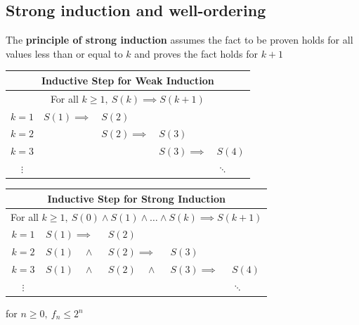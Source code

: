 \subsection{Strong induction and well-ordering}
The \textbf{principle of strong induction} assumes the fact to be proven holds for all values
less than or equal to $k$ and proves the fact holds for $k+1$
\begin{center}
  \begin{tabular}{cllll}
    \multicolumn{5}{c}{Inductive Step for Weak Induction}                  \\
    \hline
    \multicolumn{5}{c}{For all $k\geq1,~S(k) \implies S(k+1)$}             \\
    $k=1$    & $S(1)\implies$ & $S(2)$         &                &          \\
    $k=2$    &                & $S(2)\implies$ & $S(3)$         &          \\
    $k=3$    &                &                & $S(3)\implies$ & $S(4)$   \\
    $\vdots$ &                &                &                & $\ddots$
  \end{tabular}
  \qquad
  \begin{tabular}{cllll}
    \multicolumn{5}{c}{Inductive Step for Strong Induction}                                       \\
    \hline
    \multicolumn{5}{c}{For all $k\geq1,~S(0) \land S(1) \land \ldots \land S(k) \implies S(k+1)$} \\
    $k=1$    & $S(1)\implies$    & $S(2)$            &                &                           \\
    $k=2$    & $S(1)\quad\land $ & $S(2)\implies$    & $S(3)$         &                           \\
    $k=3$    & $S(1)\quad\land $ & $S(2)\quad\land $ & $S(3)\implies$ & $S(4)$                    \\
    $\vdots$ &                   &                   &                & $\ddots$
  \end{tabular}
\end{center}
for $n\geq0,~f_n \leq 2^n$
